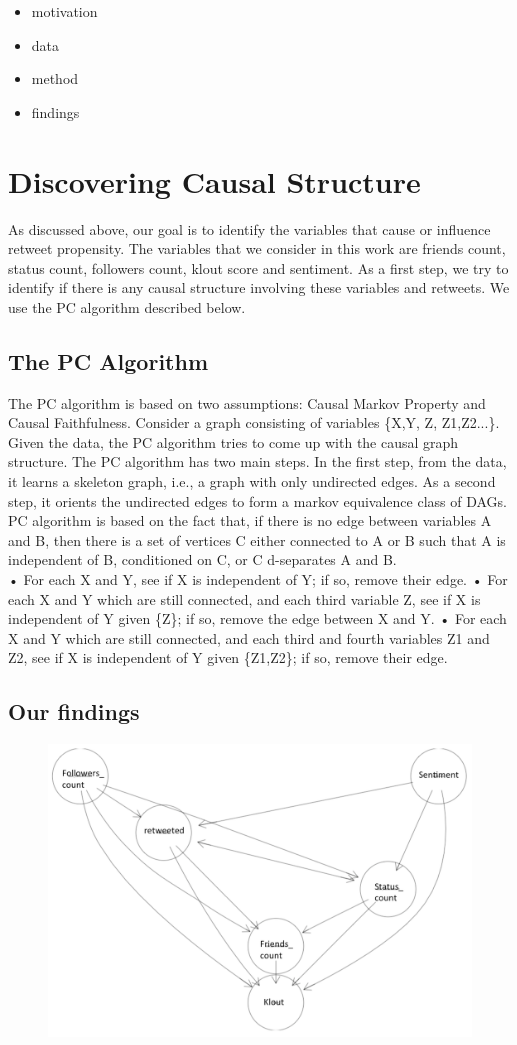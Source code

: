 \begin{itemize}
\item motivation
\item data
\item method
\item findings
\end{itemize}
\section{Discovering Causal Structure}
As discussed above, our goal is to identify the variables that cause or influence retweet propensity. The variables that we consider in this work are friends count, status count, followers count, klout score and sentiment. As a first step, we try to identify if there is any causal structure involving  these variables and retweets. We use the PC algorithm described below. 
\subsection{The PC Algorithm}
The PC algorithm is based on two assumptions: Causal Markov Property and Causal Faithfulness. Consider a graph consisting of variables \{X,Y, Z, Z1,Z2...\}. Given the data, the PC algorithm tries to come up with the causal graph structure. The PC algorithm has two main steps. In the first step, from the data, it learns a skeleton graph, i.e., a graph with only undirected edges. As a second step, it orients the undirected edges to form a markov equivalence class of DAGs. PC algorithm is based on the fact that, if there is no edge between variables A and B, then there is a set of vertices C either connected to A or B such that A is independent of B, conditioned on C, or C d-separates A and B. \\
• For each X and Y, see if X is independent of Y; if so, remove their edge.
• For each X and Y which are still connected, and each third variable Z, see if
X is independent of Y given \{Z\}; if so, remove the edge between X and Y.
• For each X and Y which are still connected, and each third and fourth variables
Z1 and Z2, see if X is independent of Y given \{Z1,Z2\}; if so, remove their edge.

\subsection{Our findings}

\begin{center}
\begin{figure}
\includegraphics[scale=0.2]{pc}
\end{figure}
\end{center}

